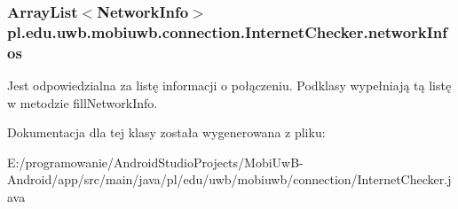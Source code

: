 \subsubsection[{network\+Infos}]{\setlength{\rightskip}{0pt plus 5cm}Array\+List$<$Network\+Info$>$ pl.\+edu.\+uwb.\+mobiuwb.\+connection.\+Internet\+Checker.\+network\+Infos\hspace{0.3cm}{\ttfamily [protected]}}\label{classpl_1_1edu_1_1uwb_1_1mobiuwb_1_1connection_1_1_internet_checker_a2edc06b95c5a74eee801d1dd2643b464}
Jest odpowiedzialna za listę informacji o połączeniu. Podklasy wypełniają tą listę w metodzie fill\+Network\+Info. 

Dokumentacja dla tej klasy została wygenerowana z pliku\+:\begin{DoxyCompactItemize}
\item 
E\+:/programowanie/\+Android\+Studio\+Projects/\+Mobi\+Uw\+B-\/\+Android/app/src/main/java/pl/edu/uwb/mobiuwb/connection/Internet\+Checker.\+java\end{DoxyCompactItemize}
